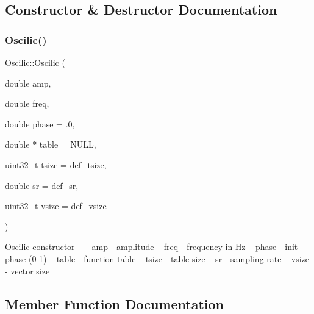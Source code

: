 \subsection{Constructor \& Destructor Documentation}
\mbox{\label{class_oscilic_a7518bfbb2bae80e100af56f5caf58cd8}} 
\subsubsection{\texorpdfstring{Oscilic()}{Oscilic()}}
{\footnotesize\ttfamily Oscilic\+::\+Oscilic (\begin{DoxyParamCaption}\item[{double}]{amp,  }\item[{double}]{freq,  }\item[{double}]{phase = {\ttfamily .0},  }\item[{double $\ast$}]{table = {\ttfamily NULL},  }\item[{uint32\+\_\+t}]{tsize = {\ttfamily def\+\_\+tsize},  }\item[{double}]{sr = {\ttfamily def\+\_\+sr},  }\item[{uint32\+\_\+t}]{vsize = {\ttfamily def\+\_\+vsize} }\end{DoxyParamCaption})\hspace{0.3cm}{\ttfamily [inline]}}

\hyperlink{class_oscilic}{Oscilic} constructor ~\newline
~\newline
amp -\/ amplitude ~\newline
freq -\/ frequency in Hz ~\newline
phase -\/ init phase (0-\/1) ~\newline
 table -\/ function table ~\newline
tsize -\/ table size ~\newline
sr -\/ sampling rate ~\newline
vsize -\/ vector size ~\newline


\subsection{Member Function Documentation}
\mbox{\label{class_oscilic_adcff5c6c3fd5a4da4bc76e05091d6dda}} 
